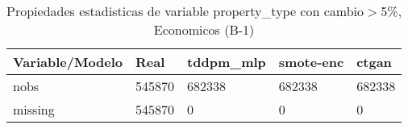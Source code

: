 \begin{table}[H]
\centering
\fontsize{8}{14}\selectfont
\caption{Propiedades estadisticas de variable property\_type con cambio\ensuremath{>}5\%, Economicos (B-1)}
\label{table-stats-economicos-b-1-property_type-short}
\begin{tabular}{|l|m{10em}|m{10em}|m{10em}|m{10em}|}
\hline
 \rowcolor[gray]{0.8}
Variable/Modelo & Real & tddpm\_mlp & smote-enc & ctgan \\
\hline nobs & 545870 & 682338 & 682338 & 682338 \\
\hline missing & 545870 & 0 & 0 & 0 \\
\hline
\end{tabular}
\end{table}
